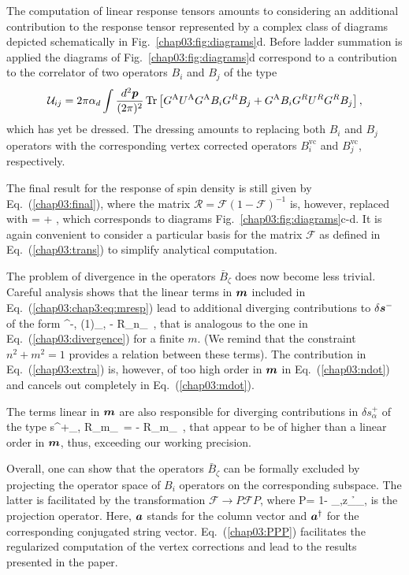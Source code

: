 The computation of linear response tensors amounts to considering an additional contribution to the response tensor represented by a complex class of diagrams depicted schematically in  Fig.~\ref{chap03:fig:diagrams}d. Before ladder summation is applied the diagrams of Fig.~\ref{chap03:fig:diagrams}d correspond to a contribution to the correlator of two operators $B_i$ and $B_j$ of the type 
\begin{align}
\mathcal{U}_{ij} = 2\pi\alpha_d \int \frac{d^2\boldsymbol{p}}{(2\pi)^2} \operatorname{Tr}\left[G^\text{A} U^\text{A} G^\text{A} B_i G^R B_j\nonumber+G^\text{A} B_i G^R U^R G^R B_j\right],   
\end{align}
which has yet be dressed. The dressing amounts to replacing both $B_i$ and $B_j$ operators with the corresponding vertex corrected operators $B^\textrm{vc}_i$ and $B^\textrm{vc}_j$, respectively. 

The final result for the response of spin density is still given by Eq.~(\ref{chap03:final}), where the matrix $\mathcal{R}=\mathcal{F}(1-\mathcal{F})^{-1}$ is, however, replaced with 
\be
\label{chap03:chap3:eq:mresp}
= + ,
\e
which corresponds to diagrams Fig.~\ref{chap03:fig:diagrams}c-d.
It is again convenient to consider a particular basis for the matrix $\mathcal{F}$ as defined in Eq.~(\ref{chap03:trans}) to simplify analytical computation.  

The problem of divergence in the operators $\bar{B}_\zeta$ does now become less trivial. Careful analysis shows that the linear terms in $\boldsymbol{m}$ included in Eq.~(\ref{chap03:chap3:eq:mresp}) lead to additional diverging contributions to $\delta\boldsymbol{s}^{-}$ of the form
\be
\label{chap03:extra}
\delta{}^{-, (1)}_{,\alpha} \propto  - R_\infty n_\alpha\, \cdot{},
\e
that is analogous to the one in Eq.~(\ref{chap03:divergence}) for a finite $m$. (We remind that the constraint $n^2+m^2=1$ provides a relation between these terms). The contribution in Eq.~(\ref{chap03:extra}) is, however, of too high order in $\boldsymbol{m}$ in Eq.~(\ref{chap03:ndot}) and cancels out completely in Eq.~(\ref{chap03:mdot}).

The terms linear in $\boldsymbol{m}$ are also responsible for diverging contributions in $\delta s_\alpha^{+}$ of the type 
\be
\delta s^{+}_{,\alpha} \propto R_\infty m_\alpha\, \cdot{}= - R_\infty m_\alpha\, \cdot{},
\e
that appear to be of higher than a linear order in $\boldsymbol{m}$, thus, exceeding our working precision.

Overall, one can show that the operators $\bar{B}_\zeta$ can be formally excluded by projecting the operator space of $B_i$ operators on the corresponding subspace. The latter is facilitated by the transformation $\mathcal{F}\to P\mathcal{F}P$, where 
\be
\label{chap03:PPP}
P= 1- \s_{,z}_\zeta {}\h_\zeta, 
\e
is the projection operator. Here, $\boldsymbol{a}$ stands for the column vector and $\boldsymbol{a}^\dagger$ for the corresponding conjugated string vector. Eq.~(\ref{chap03:PPP}) facilitates the regularized computation of the vertex corrections and lead to the results presented in the paper.